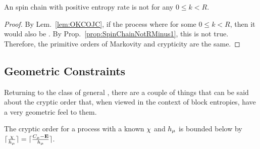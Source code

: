 \begin{Prop}
An  spin chain with positive entropy rate is not  for any $0 \le k < R$.
\end{Prop}

\begin{proof}
By Lem.~\ref{lem:OKCOJC}, if the process where  for some $0 \le k < R$, 
then it would also be . By Prop.~\ref{prop:SpinChainNotRMinus1}, 
this is not true. Therefore, the primitive orders of Markovity and crypticity 
are the same. 
\end{proof}

\subsection{Geometric Constraints}
Returning to the class of general \eMs, there are a couple of things that can be said about the cryptic order that, when viewed in the context of block entropies, have a very geometric feel to them. 

\begin{Prop}
The cryptic order for a process with a known $\chi$ and $h_\mu$ is bounded below by $\lceil\frac{\chi}{h_\mu}\rceil = \lceil\frac{C_\mu - {\bf E}}{h_\mu}\rceil$.
\end{Prop}

